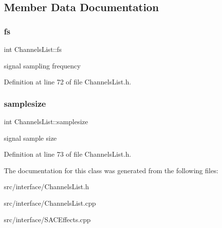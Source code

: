 \subsection{Member Data Documentation}
\mbox{\label{class_channels_list_ab5b3fd699a6c96a59d237ff4e23fa3fa}} 
\subsubsection{\texorpdfstring{fs}{fs}}
{\footnotesize\ttfamily int Channels\+List\+::fs\hspace{0.3cm}{\ttfamily [static]}}

signal sampling frequency 

Definition at line 72 of file Channels\+List.\+h.

\mbox{\label{class_channels_list_ac9208b24e03fac37e06e9664ed26b13b}} 
\subsubsection{\texorpdfstring{samplesize}{samplesize}}
{\footnotesize\ttfamily int Channels\+List\+::samplesize\hspace{0.3cm}{\ttfamily [static]}}

signal sample size 

Definition at line 73 of file Channels\+List.\+h.



The documentation for this class was generated from the following files\+:\begin{DoxyCompactItemize}
\item 
src/interface/Channels\+List.\+h\item 
src/interface/Channels\+List.\+cpp\item 
src/interface/S\+A\+C\+Effects.\+cpp\end{DoxyCompactItemize}
